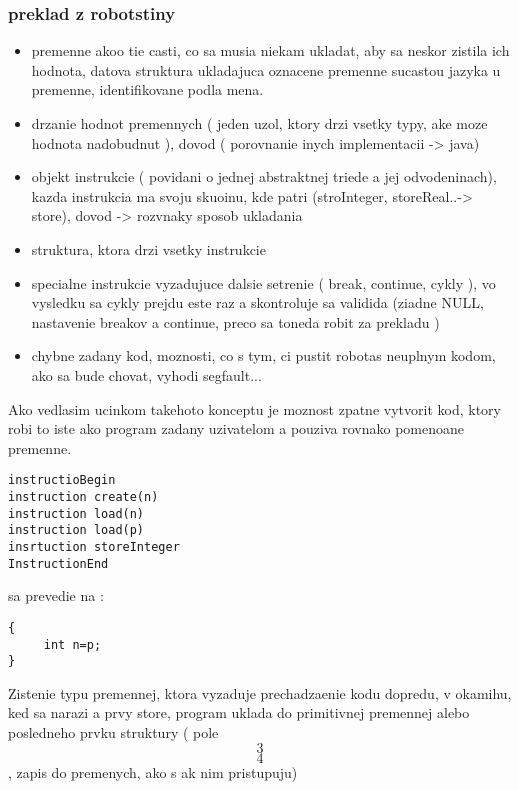\documentclass[a4paper,11pt,final]{report}
\begin{document}
\subsubsection{preklad z robotstiny}
\begin{itemize}
\item premenne akoo tie casti, co sa musia niekam ukladat, aby sa neskor zistila ich hodnota, datova struktura ukladajuca oznacene premenne
sucastou jazyka u premenne, identifikovane podla mena.  
\item drzanie hodnot premennych ( jeden uzol, ktory drzi vsetky typy, ake moze hodnota nadobudnut ), dovod ( porovnanie inych implementacii -> java)
\item objekt instrukcie ( povidani o jednej abstraktnej triede a jej odvodeninach), kazda instrukcia ma svoju skuoinu, kde patri (stroInteger, storeReal..-> store), dovod -> rozvnaky sposob ukladania
\item struktura, ktora drzi vsetky instrukcie
\item specialne instrukcie vyzadujuce dalsie setrenie ( break, continue, cykly ), vo vysledku sa cykly prejdu este raz a skontroluje sa validida (ziadne NULL, nastavenie breakov a continue, preco sa toneda robit za prekladu )
\item chybne zadany kod, moznosti, co s tym, ci pustit robotas  neuplnym kodom, ako sa bude chovat, vyhodi segfault...
\end{itemize}
Ako vedlasim ucinkom takehoto konceptu je moznost zpatne vytvorit kod, ktory robi to iste ako program zadany uzivatelom a pouziva rovnako pomenoane premenne.
\begin{verbatim}
instructioBegin    
instruction create(n)
instruction load(n)
instruction load(p)
insrtuction storeInteger
InstructionEnd
\end{verbatim}
sa prevedie na :
\begin{verbatim}
{
     int n=p;
}
\end{verbatim}
Zistenie typu premennej, ktora vyzaduje prechadzaenie kodu dopredu, v okamihu, ked sa narazi a prvy store, program uklada do primitivnej premennej alebo posledneho prvku  struktury ( pole \[3\]\[4\], zapis do premenych, ako s ak nim pristupuju)
\end{document}
